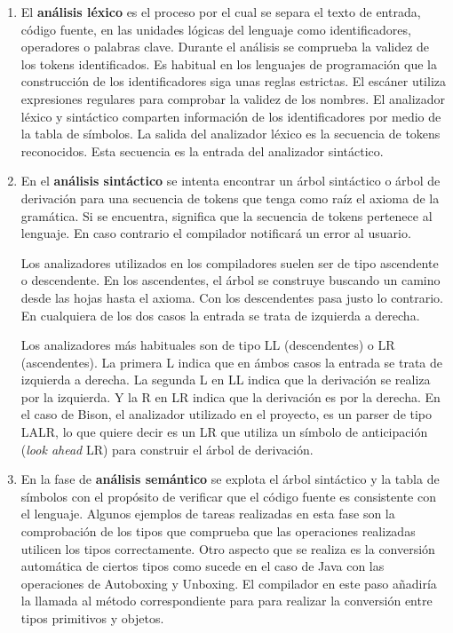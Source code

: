 \begin{enumerate}
    \item El \textbf{análisis léxico} es el proceso por el cual se separa el texto de entrada, código fuente, en las unidades lógicas del lenguaje como identificadores, operadores o palabras clave. 
    Durante el análisis se comprueba la validez de los tokens identificados. Es habitual en los lenguajes de programación que la construcción de los identificadores siga unas reglas estrictas. El escáner utiliza expresiones regulares para comprobar la validez de los nombres.
    El analizador léxico y sintáctico comparten información de los identificadores por medio de la tabla de símbolos.
    La salida del analizador léxico es la secuencia de tokens reconocidos. Esta secuencia es la entrada del analizador sintáctico.
    
    \item En el \textbf{análisis sintáctico} se intenta encontrar un árbol sintáctico o árbol de derivación para una secuencia de tokens que tenga como raíz el axioma de la gramática. Si se encuentra, significa que la secuencia de tokens pertenece al lenguaje. En caso contrario el compilador notificará un error al usuario.
    
    Los analizadores utilizados en los compiladores suelen ser de tipo ascendente o descendente. En los ascendentes, el árbol se construye buscando un camino desde las hojas hasta el axioma. Con los descendentes pasa justo lo contrario. En cualquiera de los dos casos la entrada se trata de izquierda a derecha. 
    
    Los analizadores más habituales son de tipo LL (descendentes) o LR (ascendentes). La primera L indica que en ámbos casos la entrada se trata de izquierda a derecha. La segunda L en LL indica que la derivación se realiza por la izquierda. Y la R en LR indica que la derivación es por la derecha. En el caso de Bison, el analizador utilizado en el proyecto, es un parser de tipo LALR, lo que quiere decir es un LR que utiliza un símbolo de anticipación (\emph{look ahead} LR) para construir el árbol de derivación. 

    \item En la fase de \textbf{análisis semántico} se explota el árbol sintáctico y la tabla de símbolos con el propósito de verificar que el código fuente es consistente con el lenguaje. Algunos ejemplos de tareas realizadas en esta fase son la comprobación de los tipos que comprueba que las operaciones realizadas utilicen los tipos correctamente. Otro aspecto que se realiza es la conversión automática de ciertos tipos como sucede en el caso de Java con las operaciones de Autoboxing y Unboxing. El compilador en este paso añadiría la llamada al método correspondiente para para realizar la conversión entre tipos primitivos y objetos.
    

\end{enumerate}

